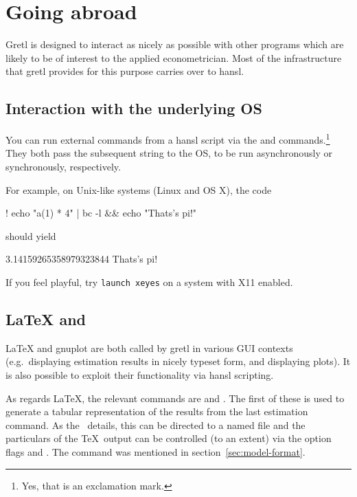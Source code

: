 
\chapter{Going abroad}


Gretl is designed to interact as nicely as possible with other
programs which are likely to be of interest to the applied
econometrician. Most of the infrastructure that gretl provides for
this purpose carries over to hansl.

\section{Interaction with the underlying OS}

You can run external commands from a hansl script via the 
and \cmd{!} commands.\footnote{Yes, that is an exclamation mark.} They
both pass the subsequent string to the OS, to be run asynchronously
or synchronously, respectively.

For example, on Unix-like systems (Linux and OS X), the code
\begin{code}
! echo "a(1) * 4" | bc -l && echo "Thats's pi!"
\end{code}

should yield

\begin{code}
3.14159265358979323844
Thats's pi!
\end{code}

If you feel playful, try \texttt{launch xeyes} on a system with X11
enabled.

\section{\LaTeX{} and }

\LaTeX{} and \textsf{gnuplot} are both called by gretl in various GUI
contexts (e.g.\ displaying estimation results in nicely typeset form,
and displaying plots). It is also possible to exploit their
functionality via hansl scripting. 

As regards \LaTeX, the relevant commands are  and
. The first of these is used to generate a tabular
representation of the results from the last estimation command. As the 
\GCR\ details, this can be directed to a named file and the 
particulars of the \TeX\ output can be controlled (to an extent) via
the option flags  and . The
 command was mentioned in section~\ref{sec:model-format}.

